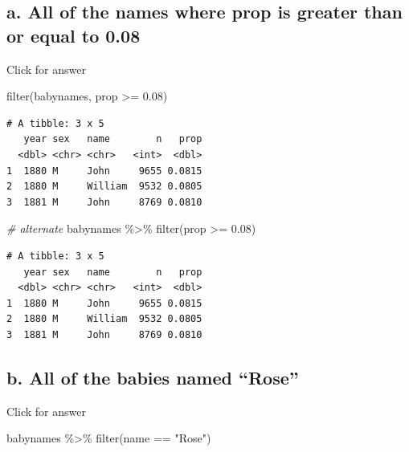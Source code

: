 \documentclass[
]{book}
\newenvironment{Shaded}{\begin{snugshade}}{\end{snugshade}}
\newcommand{\CommentTok}[1]{\textcolor[rgb]{0.56,0.35,0.01}{\textit{#1}}}
\newcommand{\FloatTok}[1]{\textcolor[rgb]{0.00,0.00,0.81}{#1}}
\newcommand{\FunctionTok}[1]{\textcolor[rgb]{0.00,0.00,0.00}{#1}}
\newcommand{\NormalTok}[1]{#1}
\newcommand{\SpecialCharTok}[1]{\textcolor[rgb]{0.00,0.00,0.00}{#1}}
\newcommand{\StringTok}[1]{\textcolor[rgb]{0.31,0.60,0.02}{#1}}
\begin{document}
\hypertarget{a.-all-of-the-names-where-prop-is-greater-than-or-equal-to-0.08}{%
\subsection{a. All of the names where prop is greater than or equal to 0.08}\label{a.-all-of-the-names-where-prop-is-greater-than-or-equal-to-0.08}}

Click for answer

\begin{Shaded}
\begin{Highlighting}[]
\FunctionTok{filter}\NormalTok{(babynames, prop }\SpecialCharTok{\textgreater{}=} \FloatTok{0.08}\NormalTok{)}
\end{Highlighting}
\end{Shaded}

\begin{verbatim}
# A tibble: 3 x 5
   year sex   name        n   prop
  <dbl> <chr> <chr>   <int>  <dbl>
1  1880 M     John     9655 0.0815
2  1880 M     William  9532 0.0805
3  1881 M     John     8769 0.0810
\end{verbatim}

\begin{Shaded}
\begin{Highlighting}[]
\CommentTok{\# alternate}
\NormalTok{babynames }\SpecialCharTok{\%\textgreater{}\%} \FunctionTok{filter}\NormalTok{(prop }\SpecialCharTok{\textgreater{}=} \FloatTok{0.08}\NormalTok{)}
\end{Highlighting}
\end{Shaded}

\begin{verbatim}
# A tibble: 3 x 5
   year sex   name        n   prop
  <dbl> <chr> <chr>   <int>  <dbl>
1  1880 M     John     9655 0.0815
2  1880 M     William  9532 0.0805
3  1881 M     John     8769 0.0810
\end{verbatim}

\hypertarget{b.-all-of-the-babies-named-rose}{%
\subsection{b. All of the babies named ``Rose''}\label{b.-all-of-the-babies-named-rose}}

Click for answer

\begin{Shaded}
\begin{Highlighting}[]
\NormalTok{babynames }\SpecialCharTok{\%\textgreater{}\%} \FunctionTok{filter}\NormalTok{(name }\SpecialCharTok{==} \StringTok{"Rose"}\NormalTok{)}
\end{Highlighting}
\end{Shaded}
\end{document}
